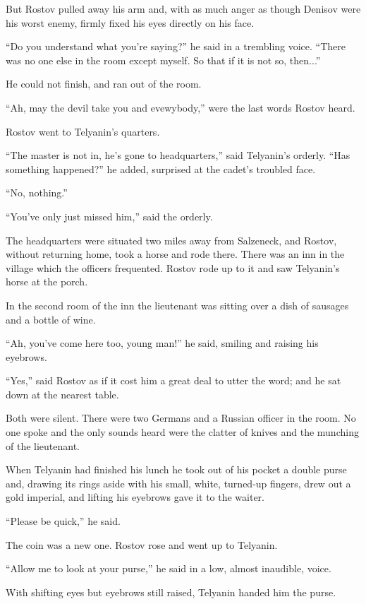 But Rostov pulled away his arm and, with as much anger as though
Denisov were his worst enemy, firmly fixed his eyes directly on
his face.

``Do you understand what you're saying?'' he said in a trembling
voice.  ``There was no one else in the room except myself. So
that if it is not so, then...''

He could not finish, and ran out of the room.

``Ah, may the devil take you and evewybody,'' were the last words
Rostov heard.

Rostov went to Telyanin's quarters.

``The master is not in, he's gone to headquarters,'' said
Telyanin's orderly. ``Has something happened?'' he added,
surprised at the cadet's troubled face.

``No, nothing.''

``You've only just missed him,'' said the orderly.

The headquarters were situated two miles away from Salzeneck, and
Rostov, without returning home, took a horse and rode
there. There was an inn in the village which the officers
frequented. Rostov rode up to it and saw Telyanin's horse at the
porch.

In the second room of the inn the lieutenant was sitting over a
dish of sausages and a bottle of wine.

``Ah, you've come here too, young man!'' he said, smiling and
raising his eyebrows.

``Yes,'' said Rostov as if it cost him a great deal to utter the
word; and he sat down at the nearest table.

Both were silent. There were two Germans and a Russian officer in
the room. No one spoke and the only sounds heard were the clatter
of knives and the munching of the lieutenant.

When Telyanin had finished his lunch he took out of his pocket a
double purse and, drawing its rings aside with his small, white,
turned-up fingers, drew out a gold imperial, and lifting his
eyebrows gave it to the waiter.

``Please be quick,'' he said.

The coin was a new one. Rostov rose and went up to Telyanin.

``Allow me to look at your purse,'' he said in a low, almost
inaudible, voice.

With shifting eyes but eyebrows still raised, Telyanin handed him
the purse.

